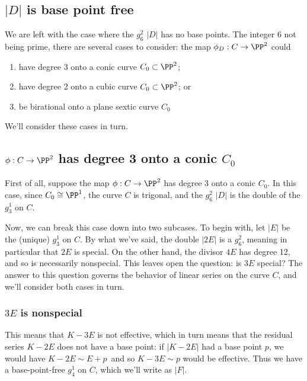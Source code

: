 \subsection{$|D|$ is base point free}



We are left with the case where the $g^2_6$ $|D|$ has no base points. The integer 6 not being prime, there are several cases to consider: the map $\phi_D : C \to \PP^2$ could
\begin{enumerate}
\item have degree 3 onto a conic curve $C_0 \subset \PP^2$;
\item have degree 2 onto a cubic curve $C_0 \subset \PP^2$; or
\item be birational onto a plane sextic curve $C_0$
\end{enumerate}
We'll consider these cases in turn.

\subsection{$\phi : C \to \PP^2$ has degree 3 onto a conic $C_0$}

First of all, suppose the map $\phi : C \to \PP^2$ has degree 3 onto a conic $C_0$. In this case, since $C_0 \cong \PP^1$, the curve $C$ is trigonal, and the $g^2_6$ $|D|$ is the double of the $g^1_3$ on $C$. 

Now, we can break this case down into two subcases. To begin with, let $|E|$ be the (unique) $g^1_3$ on $C$. By what we've said, the double $|2E|$ is a $g^2_6$, meaning in particular that $2E$ is special. On the other hand, the divisor $4E$ has degree 12, and so is necessarily nonspecial. This leaves open the question: is $3E$ special? The answer to this question governs the behavior of linear series on the curve $C$, and we'll consider both cases in turn.

\subsubsection{$3E$ is nonspecial} This means that $K-3E$ is not effective, which in turn means that the residual series $K-2E$ does not have a base point: if $|K-2E|$ had a base point $p$, we would have $K - 2E \sim E + p$\, and so $K-3E \sim p$ would be effective. Thus we have a base-point-free $g^1_4$ on $C$, which we'll write as $|F|$.

